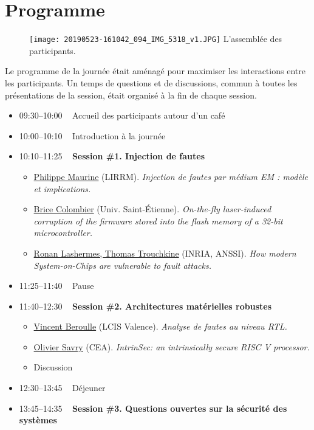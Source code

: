 \documentclass[a4paper,11pt]{article}
\begin{document}
\section{Programme}
\label{sec:orgf5faf83}

\begin{figure}[t]
\centering
\texttt{[image: 20190523-161042\_094\_IMG\_5318\_v1.JPG]}
L'assemblée des participants.
\end{figure}

Le programme de la journée était aménagé pour maximiser les
interactions entre les participants.  Un temps de questions et de
discussions, commun à toutes les présentations de la session, était
organisé à la fin de chaque session.

\begin{itemize}
\item 09:30--10:00   Accueil des participants autour d’un café
\item 10:00--10:10   Introduction à la journée
\item 10:10--11:25   \textbf{Session \#1. Injection de fautes}
\begin{itemize}
\item \hyperref[sec:orga168fcd]{Philippe Maurine} (LIRRM). \emph{Injection de fautes par médium EM : modèle et implications.}
\item \hyperref[sec:orgdad3399]{Brice Colombier} (Univ. Saint-Étienne). \emph{On-the-fly laser-induced corruption of the firmware stored into the flash memory of a 32-bit microcontroller.}
\item \hyperref[sec:org7efae5b]{Ronan Lashermes, Thomas Trouchkine} (INRIA, ANSSI). \emph{How modern System-on-Chips are vulnerable to fault attacks.}
\end{itemize}
\item 11:25--11:40   Pause
\item 11:40--12:30   \textbf{Session \#2. Architectures matérielles robustes}
\begin{itemize}
\item \hyperref[sec:org14c2e8d]{Vincent Beroulle} (LCIS Valence). \emph{Analyse de fautes au niveau RTL.}
\item \hyperref[sec:org922ed13]{Olivier Savry} (CEA). \emph{IntrinSec: an intrinsically secure RISC V processor.}
\item Discussion
\end{itemize}
\item 12:30--13:45   Déjeuner
\item 13:45--14:35   \textbf{Session \#3. Questions ouvertes sur la sécurité des systèmes}

\end{itemize}
\end{document}
